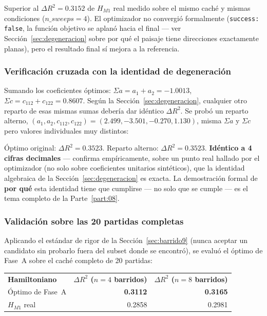 \documentclass[11pt, a4paper]{article}
\newcommand{\TH}[1]{\cellcolor{cTHbg}\color{white}\textbf{#1}}
\newcommand{\good}[1]{\color{cGood}\textbf{#1}}
\begin{document}
Superior al $\Delta R^2=0.3152$ de $H_{M1}$ real medido sobre el mismo
cach\'e y mismas condiciones ($n\_sweeps=4$). El optimizador no
convergi\'o formalmente (\texttt{success: false}, la funci\'on
objetivo se aplan\'o hacia el final --- ver Secci\'on~\ref{sec:degeneracion}
sobre por qu\'e el paisaje tiene direcciones exactamente planas), pero
el resultado final s\'i mejora a la referencia.

\subsubsection{Verificaci\'on cruzada con la identidad de degeneraci\'on}

Sumando los coeficientes \'optimos: $\Sigma a = a_1+a_2 = -1.0013$,
$\Sigma c = c_{112}+c_{122} = 0.8607$. Seg\'un la
Secci\'on~\ref{sec:degeneracion}, cualquier otro reparto de esas
mismas sumas deber\'ia dar id\'entico $\Delta R^2$. Se prob\'o un
reparto alterno, $(a_1,a_2,c_{112},c_{122}) = (2.499,-3.501,-0.270,1.130)$,
misma $\Sigma a$ y $\Sigma c$ pero valores individuales muy distintos:

\begin{tcolorbox}[quotebox]
  \'Optimo original: $\Delta R^2=0.3523$. Reparto alterno:
  $\Delta R^2=0.3523$. \textbf{Id\'entico a 4 cifras decimales} ---
  confirma emp\'iricamente, sobre un punto real hallado por el
  optimizador (no solo sobre coeficientes unitarios sint\'eticos),
  que la identidad algebraica de la Secci\'on~\ref{sec:degeneracion}
  es exacta. La demostraci\'on formal de \textbf{por qu\'e} esta
  identidad tiene que cumplirse --- no solo que se cumple --- es el
  tema completo de la Parte~\ref{part:08}.
\end{tcolorbox}

\subsubsection{Validaci\'on sobre las 20 partidas completas}

Aplicando el est\'andar de rigor de la Secci\'on~\ref{sec:barrido9}
(nunca aceptar un candidato sin probarlo fuera del subset donde se
encontr\'o), se evalu\'o el \'optimo de Fase~A sobre el cach\'e
completo de 20 partidas:

\medskip
\begin{center}
\begin{tabular}{lrr}
  \TH{Hamiltoniano} & \TH{$\Delta R^2$ ($n{=}4$ barridos)} & \TH{$\Delta R^2$ ($n{=}8$ barridos)} \\[1pt]
  \'Optimo de Fase~A & \good{0.3112} & \good{0.3165} \\
  $H_{M1}$ real       & 0.2858 & 0.2981 \\
\end{tabular}
\end{center}
\medskip
\end{document}
